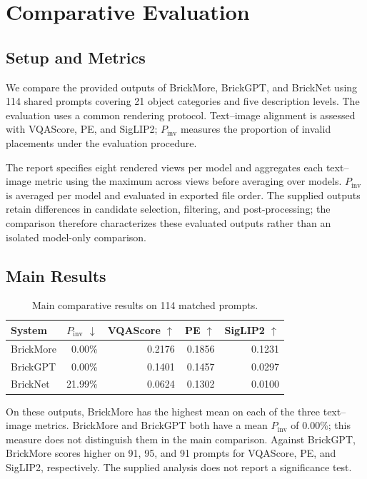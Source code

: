 \documentclass[10pt,twocolumn,letterpaper]{article}
\begin{document}
\section{Comparative Evaluation}
\subsection{Setup and Metrics}
We compare the provided outputs of BrickMore, BrickGPT, and BrickNet using 114 shared prompts covering 21 object categories and five description levels. The evaluation uses a common rendering protocol. Text--image alignment is assessed with VQAScore, PE, and SigLIP2; $P_{\mathrm{inv}}$ measures the proportion of invalid placements under the evaluation procedure.

The report specifies eight rendered views per model and aggregates each text--image metric using the maximum across views before averaging over models. $P_{\mathrm{inv}}$ is averaged per model and evaluated in exported file order. The supplied outputs retain differences in candidate selection, filtering, and post-processing; the comparison therefore characterizes these evaluated outputs rather than an isolated model-only comparison.

\subsection{Main Results}
\begin{table}[t]\centering\small\begin{tabular}{lrrrr}\toprule
System & $P_{\mathrm{inv}}$ $\downarrow$ & VQAScore $\uparrow$ & PE $\uparrow$ & SigLIP2 $\uparrow$ \\ \midrule
BrickMore & 0.00\% & 0.2176 & 0.1856 & 0.1231 \\
BrickGPT & 0.00\% & 0.1401 & 0.1457 & 0.0297 \\
BrickNet & 21.99\% & 0.0624 & 0.1302 & 0.0100 \\
\bottomrule\end{tabular}\caption{Main comparative results on 114 matched prompts.}\end{table}
On these outputs, BrickMore has the highest mean on each of the three text--image metrics. BrickMore and BrickGPT both have a mean $P_{\mathrm{inv}}$ of 0.00\%; this measure does not distinguish them in the main comparison. Against BrickGPT, BrickMore scores higher on 91, 95, and 91 prompts for VQAScore, PE, and SigLIP2, respectively. The supplied analysis does not report a significance test.
\end{document}
